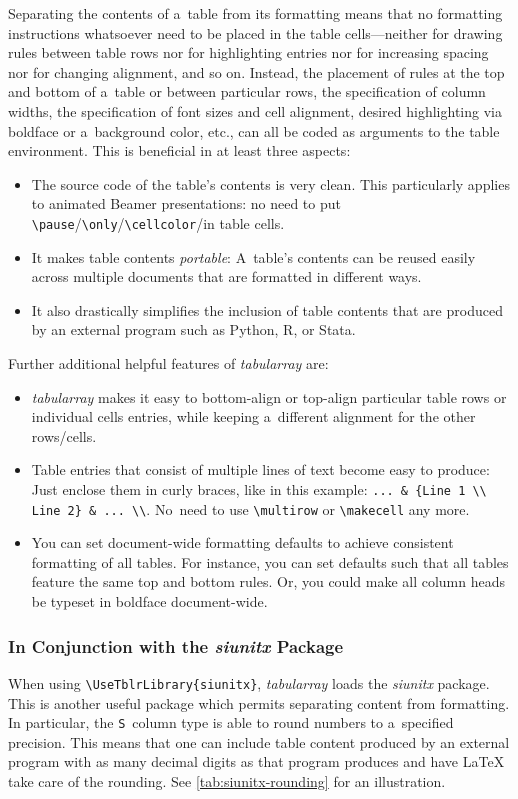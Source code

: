 Separating the contents of a~table from its formatting means that no formatting instructions whatsoever need to be placed in the table cells---neither for drawing rules between table rows nor for highlighting entries nor for increasing spacing nor for changing alignment, and so on. Instead, the placement of rules at the top and bottom of a~table or between particular rows, the specification of column widths, the specification of font sizes and cell alignment, desired highlighting via boldface or a~background color, etc., can all be coded as arguments to the table environment. This is beneficial in at least three aspects:
\begin{itemize}
	\item The source code of the table's contents is very clean. This particularly applies to animated Beamer presentations: no need to put \verb|\pause|\slash \verb|\only|\slash \verb|\cellcolor|\slash\textellipsis in table cells.
	\item  It makes table contents \emph{portable}: A~table's contents can be reused easily across multiple documents that are formatted in different ways.
	\item  It also drastically simplifies the inclusion of table contents that are produced by an external program such as Python, R, or Stata.
\end{itemize}

Further additional helpful features of \mbox{\textit{tabularray}} are:
\begin{itemize}
	\item \mbox{\textit{tabularray}} makes it easy to bottom-align or top-align particular table rows or individual cells entries, while keeping a~different alignment for the other rows\slash cells.
	\item Table entries that consist of multiple lines of text become easy to produce: Just enclose them in curly braces, like in this example: \verb|... & {Line 1 \\ Line 2} & ... \\|. No~need to use \verb|\multirow| or \verb|\makecell| any more.
	\item You can set document-wide formatting defaults to achieve consistent formatting of all tables. For instance, you can set defaults such that all tables feature the same top and bottom rules. Or, you could make all column heads be typeset in boldface document-wide.
\end{itemize}

\subsubsection{In Conjunction with the \textit{siunitx} Package}
When using \verb|\UseTblrLibrary{siunitx}|, \mbox{\textit{tabularray}} loads the \mbox{\textit{siunitx}} package. This is another useful package which permits separating content from formatting. In particular, the \verb|S|~column type is able to round numbers to a~specified precision. This means that one can include table content produced by an external program with as many decimal digits as that program produces and have LaTeX take care of the rounding. See \autoref{tab:siunitx-rounding} for an illustration.


